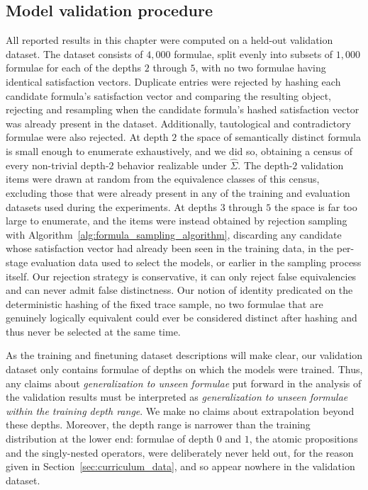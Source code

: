 \documentclass[titlepage,a4paper,11pt]{report}
\begin{document}
    \subsection{Model validation procedure}\label{sec:model_validation}
    All reported results in this chapter were computed on a held-out validation dataset. The dataset consists of $4{,}000$ formulae, split evenly into subsets of $1{,}000$ formulae for each of the depths $2$ through $5$, with no two formulae having identical satisfaction vectors. Duplicate entries were rejected by hashing each candidate formula's satisfaction vector and comparing the resulting object, rejecting and resampling when the candidate formula's hashed satisfaction vector was already present in the dataset. Additionally, tautological and contradictory formulae were also rejected. At depth $2$ the space of semantically distinct formula is small enough to enumerate exhaustively, and we did so, obtaining a census of every non-trivial depth-$2$ behavior realizable under $\widehat \Sigma$. The depth-$2$ validation items were drawn at random from the equivalence classes of this census, excluding those that were already present in any of the training and evaluation datasets used during the experiments. At depths $3$ through $5$ the space is far too large to enumerate, and the items were instead obtained by rejection sampling with Algorithm~\ref{alg:formula_sampling_algorithm}, discarding any candidate whose satisfaction vector had already been seen in the training data, in the per-stage evaluation data used to select the models, or earlier in the sampling process itself. Our rejection strategy is conservative, it can only reject false equivalencies and can never admit false distinctness. Our notion of identity predicated on the  deterministic hashing of the fixed trace sample, no two formulae that are genuinely logically equivalent could ever be considered distinct after hashing and thus never be selected at the same time. 
    
    As the training and finetuning dataset descriptions will make clear, our validation dataset only contains formulae of depths on which the models were trained. Thus, any claims about \emph{generalization to unseen formulae} put forward in the analysis of the validation results must be interpreted as \emph{generalization to unseen formulae within the training depth range}. We make no claims about extrapolation beyond these depths. Moreover, the depth range is narrower than the training distribution at the lower end: formulae of depth $0$ and $1$, the atomic propositions and the singly-nested operators, were deliberately never held out, for the reason given in Section~\ref{sec:curriculum_data}, and so appear nowhere in the validation dataset.
    
\end{document}
